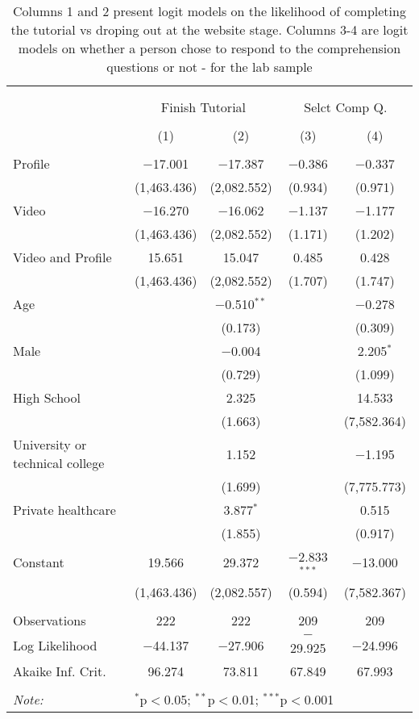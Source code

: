 
\begin{table}[H] \centering 
  \caption{Columns 1 and 2 present logit models on the likelihood of completing the tutorial vs droping out at the website stage. Columns 3-4 are logit models on whether a 
          person chose to respond to the comprehension questions or not - for the lab sample} 
  \label{tbl:attrition_lab} 
\begin{tabular}{@{\extracolsep{5pt}}lcccc} 
\\[-1.8ex]\hline 
\hline \\[-1.8ex] 
\\[-1.8ex] & \multicolumn{2}{c}{Finish Tutorial} & \multicolumn{2}{c}{Selct Comp Q.} \\ 
\\[-1.8ex] & (1) & (2) & (3) & (4)\\ 
\hline \\[-1.8ex] 
 Profile & $-$17.001 & $-$17.387 & $-$0.386 & $-$0.337 \\ 
  & (1,463.436) & (2,082.552) & (0.934) & (0.971) \\ 
  Video & $-$16.270 & $-$16.062 & $-$1.137 & $-$1.177 \\ 
  & (1,463.436) & (2,082.552) & (1.171) & (1.202) \\ 
  Video and Profile & 15.651 & 15.047 & 0.485 & 0.428 \\ 
  & (1,463.436) & (2,082.552) & (1.707) & (1.747) \\ 
  Age &  & $-$0.510$^{**}$ &  & $-$0.278 \\ 
  &  & (0.173) &  & (0.309) \\ 
  Male &  & $-$0.004 &  & 2.205$^{*}$ \\ 
  &  & (0.729) &  & (1.099) \\ 
  High School &  & 2.325 &  & 14.533 \\ 
  &  & (1.663) &  & (7,582.364) \\ 
  University or technical college &  & 1.152 &  & $-$1.195 \\ 
  &  & (1.699) &  & (7,775.773) \\ 
  Private healthcare &  & 3.877$^{*}$ &  & 0.515 \\ 
  &  & (1.855) &  & (0.917) \\ 
  Constant & 19.566 & 29.372 & $-$2.833$^{***}$ & $-$13.000 \\ 
  & (1,463.436) & (2,082.557) & (0.594) & (7,582.367) \\ 
 \hline \\[-1.8ex] 
Observations & 222 & 222 & 209 & 209 \\ 
Log Likelihood & $-$44.137 & $-$27.906 & $-$29.925 & $-$24.996 \\ 
Akaike Inf. Crit. & 96.274 & 73.811 & 67.849 & 67.993 \\ 
\hline 
\hline \\[-1.8ex] 
\textit{Note:}  & \multicolumn{4}{l}{$^{*}$p$<$0.05; $^{**}$p$<$0.01; $^{***}$p$<$0.001} \\ 
\end{tabular} 
\end{table} 
